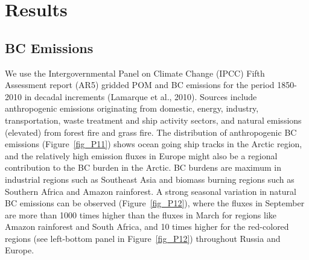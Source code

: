 \documentclass[12pt]{article}
\begin{document}
	\section{Results}
	\subsection{BC Emissions}
		We use the Intergovernmental Panel on Climate Change (IPCC) Fifth Assessment report (AR5) gridded POM and BC emissions for the period 1850-2010 in decadal increments (Lamarque et al., 2010). Sources include anthropogenic emissions originating from domestic, energy, industry, transportation, waste treatment and ship activity sectors, and natural emissions (elevated) from forest fire and grass fire. The distribution of anthropogenic BC emissions (Figure~\ref{fig_P11}) shows ocean going ship tracks in the Arctic region, and the relatively high emission fluxes in Europe might also be a regional contribution to the BC burden in the Arctic. BC burdens are maximum in industrial regions such as Southeast Asia and biomass burning regions such as Southern Africa and Amazon rainforest. A strong seasonal variation in natural BC emissions can be observed (Figure~\ref{fig_P12}), where the fluxes in September are more than 1000 times higher than the fluxes in March for regions like Amazon rainforest and South Africa, and 10 times higher for the red-colored regions (see left-bottom panel in Figure~\ref{fig_P12}) throughout Russia and Europe. 
		
\end{document}
